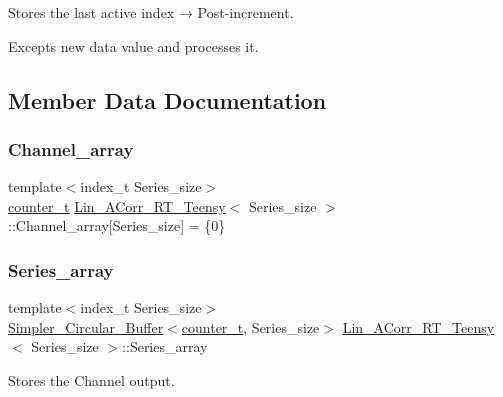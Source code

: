 Stores the last active index → Post-\/increment. 

Excepts new data value and processes it. 

\subsection{Member Data Documentation}
\mbox{\label{classLin__ACorr__RT__Teensy_af4dda93e07198bae54553a8f11773e74}} 
\subsubsection{\texorpdfstring{Channel\+\_\+array}{Channel\_array}}
{\footnotesize\ttfamily template$<$index\+\_\+t Series\+\_\+size$>$ \\
\hyperlink{types_8hpp_a22f279793847eba127de149437848c48}{counter\+\_\+t} \hyperlink{classLin__ACorr__RT__Teensy}{Lin\+\_\+\+A\+Corr\+\_\+\+R\+T\+\_\+\+Teensy}$<$ Series\+\_\+size $>$\+::Channel\+\_\+array\mbox{[}Series\+\_\+size\mbox{]} = \{0\}}

\mbox{\label{classLin__ACorr__RT__Teensy_a9a619d1a74076f0bac8b7f03acebbb75}} 
\subsubsection{\texorpdfstring{Series\+\_\+array}{Series\_array}}
{\footnotesize\ttfamily template$<$index\+\_\+t Series\+\_\+size$>$ \\
\hyperlink{classSimpler__Circular__Buffer}{Simpler\+\_\+\+Circular\+\_\+\+Buffer}$<$\hyperlink{types_8hpp_a22f279793847eba127de149437848c48}{counter\+\_\+t}, Series\+\_\+size$>$ \hyperlink{classLin__ACorr__RT__Teensy}{Lin\+\_\+\+A\+Corr\+\_\+\+R\+T\+\_\+\+Teensy}$<$ Series\+\_\+size $>$\+::Series\+\_\+array}



Stores the Channel output. 

